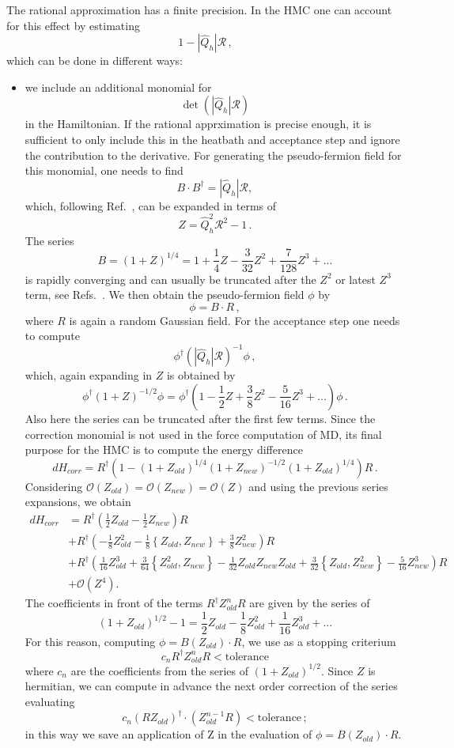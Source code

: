 The rational approximation has a finite precision. In the HMC one can
account for this effect by estimating
\[
1 - |\hat Q_h| \mathcal{R}\,,
\]
which can be done in different ways:
\begin{itemize}
\item we include an additional monomial for
  \[
  \det (|\hat Q_h| \mathcal{R})
  \]
  in the Hamiltonian. If the rational apprximation is precise enough,
  it is sufficient to only include this in the heatbath and acceptance
  step and ignore the contribution to the derivative. For generating
  the pseudo-fermion field for this monomial, one needs to find
  \[
  B\cdot B^\dagger = |\hat Q_h| \mathcal{R},
  \]
  which, following Ref.~\cite{Luscher:2010ae}, can be expanded in
  terms of
  \[
  Z = \hat Q_h^2\mathcal{R}^2 -1\,.
  \]
  The series
  \[
  B = (1+Z)^{1/4} =  1 + \frac{1}{4} Z - \frac{3}{32} Z^2 + \frac{7}{128} Z^3 + ...
  \]
  is rapidly converging and can usually be truncated after the $Z^2$
  or latest $Z^3$ term, see
  Refs.~\cite{Luscher:2010ae,Luscher:2012av}. We then obtain the
  pseudo-fermion field $\phi$ by
  \[
  \phi = B\cdot R\,,
  \]
  where $R$ is again a random Gaussian field. For the acceptance step
  one needs to compute
  \[
  \phi^\dagger (|\hat Q_h|\mathcal{R})^{-1}\phi\,,
  \]
  which, again expanding in $Z$ is obtained by
  \[
  \phi^\dagger (1+Z)^{-1/2} \phi = \phi^\dagger (1 - \frac{1}{2}Z +
  \frac{3}{8}Z^2 - \frac{5}{16}Z^3 + ...) \phi\, .
  \]
  Also here the series can be truncated after the first few terms.
  Since the correction monomial is not used in the force computation of MD,
  its final purpose for the HMC is to compute the energy difference
  \[
  dH_{corr} = R^\dagger \left(1-(1+Z_{old})^{1/4}(1+Z_{new})^{-1/2}(1+Z_{old})^{1/4}\right)R\,.
  \]
  Considering $\mathcal{O}(Z_{old}) = \mathcal{O}(Z_{new}) = \mathcal{O}(Z)$ and
  using the previous series expansions, we obtain
  \begin{align*}
  dH_{corr} & =  R^\dagger \left( \frac{1}{2} Z_{old} - \frac{1}{2} Z_{new} \right)R\\
  & + R^\dagger \left( - \frac{1}{8} Z_{old}^2 - \frac{1}{8} \left\{Z_{old} , Z_{new} \right\}  + \frac{3}{8} Z_{new}^2 \right)R\\
  & + R^\dagger \left( \frac{1}{16} Z_{old}^3 + \frac{3}{64} \left\{ Z_{old}^2 , Z_{new} \right\} - \frac{1}{32} Z_{old} Z_{new} Z_{old} + \frac{3}{32} \left\{ Z_{old} , Z_{new}^2 \right\} - \frac{5}{16} Z_{new}^3 \right)R\\
  & + \mathcal{O}(Z^4).
  \end{align*}
  The coefficients in front of the terms $R^\dagger Z_{old}^n R$ are given by the series of
  \[
  (1+Z_{old})^{1/2} -1 =  \frac{1}{2} Z_{old} - \frac{1}{8} Z_{old}^2 + \frac{1}{16} Z_{old}^3 + ...
  \]
  For this reason, computing $\phi = B(Z_{old})\cdot R$, we use as a stopping criterium
  \[
  c_n R^\dagger Z_{old}^n R < \text{tolerance}
  \]
  where $c_n$ are the coefficients from the series of $(1+Z_{old})^{1/2}$.
  Since $Z$ is hermitian, we can compute in advance the next order correction of the series evaluating
  \[
  c_n (R Z_{old})^\dagger\cdot (Z_{old}^{n-1} R) < \text{tolerance}\,;
  \]
  in this way we save an application of Z in the evaluation of $\phi = B(Z_{old})\cdot R$.
  

\end{itemize}
